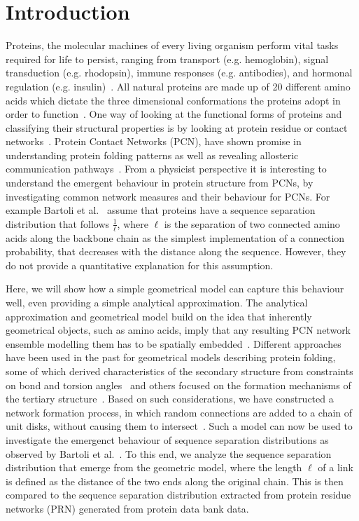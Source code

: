 \documentclass[reprint,amsmath,amssymb,rmp,onecolumn,notitlepage,11pt]{revtex4-1}
\begin{document}
\section*{Introduction}
Proteins, the molecular machines of every living organism perform vital tasks required for life to persist, ranging from transport (e.g. hemoglobin), signal transduction (e.g. rhodopsin), immune responses (e.g. antibodies), and hormonal regulation (e.g. insulin)~\cite{}. All natural proteins are made up of 20 different amino acids which dictate the three dimensional conformations the proteins adopt in order to function~\cite{}. One way of looking at the functional forms of proteins and classifying their structural properties is by looking at protein residue or contact networks~\cite{Vendruscolo2002,DiPaola2013,Estrada2011}. Protein Contact Networks (PCN), have shown promise in understanding protein folding patterns as well as revealing allosteric communication pathways~\cite{https://pubs.acs.org/doi/10.1021/acs.jcim.9b00320, and others}. 
From a physicist perspective it is interesting to understand the emergent behaviour in protein structure from PCNs, by investigating common network measures and their behaviour for PCNs. For example Bartoli et al.~\cite{bartoli2008effect} assume that proteins have a sequence separation distribution that follows $\frac{1}{\ell}$, where $\ell$ is the separation of two connected amino acids along the backbone chain as the simplest implementation of a connection probability, that decreases with the distance along the sequence. However, they do not provide a quantitative explanation for this assumption. 

Here, we will show how a simple geometrical model can capture this behaviour well, even providing a simple analytical approximation. The analytical approximation and geometrical model build on the idea that inherently geometrical objects, such as amino acids, imply that any resulting PCN network ensemble modelling them has to be spatially embedded~\cite{}. 
Different approaches have been used in the past for geometrical models describing protein folding, some of which derived characteristics of the secondary structure from constraints on bond and torsion angles~\cite{Danielsson2010,Molkenthin2011} and others focused on the formation mechanisms of the tertiary structure~\cite{molkenthin2016scaling, molkenthin2020self}. Based on such considerations, we have constructed a network formation process, in which random connections are added to a chain of unit disks, without causing them to intersect~\cite{molkenthin2016scaling}. Such a model can now be used to investigate the emergenct behaviour of sequence separation distributions as observed by Bartoli et al.~\cite{bartoli2008effect}. To this end, we analyze the sequence separation distribution that emerge from the geometric model, where the length $\ell$ of a link is defined as the distance of the two ends along the original chain.
This is then compared to the sequence separation distribution extracted from protein residue networks (PRN) generated from protein data bank data. 
\end{document}
